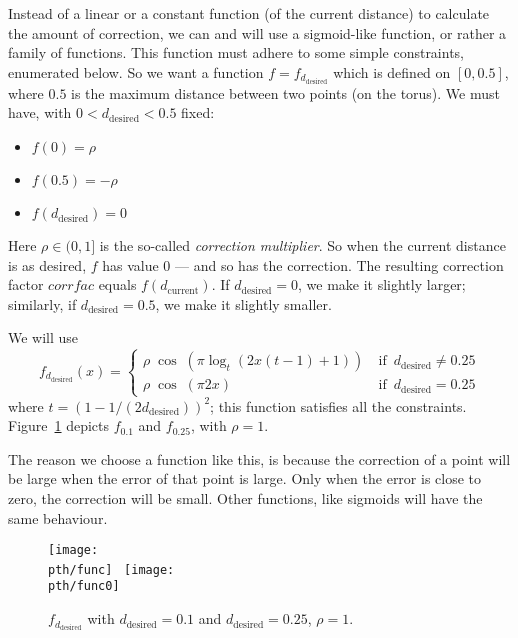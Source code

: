 \documentclass{article}
\theoremstyle{definition}
\begin{document}
Instead of a linear or a constant function (of the current distance) to
calculate the amount of correction, we can and will use a sigmoid-like
function, or rather a family of functions. This function must adhere to some
simple constraints, enumerated below. So we want a function
$f=f_{d_\mathrm{desired}}$ which is defined on $[0,0.5]$, where $0.5$ is the
maximum distance between two points (on the torus). We must have, with
$0<d_\mathrm{desired}<0.5$ fixed:
\begin{itemize}
\item $f(0) = \rho$
\item $f(0.5) = -\rho$
\item $f(d_\mathrm{desired}) = 0$
\end{itemize}
Here $\rho\in(0,1]$ is the so-called \emph{correction multiplier}. So when the
current distance is as desired, $f$ has value 0 --- and so has the correction.
The resulting correction factor $\mathit{corrfac}$ equals
$f(d_\mathrm{current})$. If $d_\mathrm{desired}=0$, we make it slightly
larger; similarly, if $d_\mathrm{desired}=0.5$, we make it slightly smaller.

We will use
\begin{displaymath}
  f_{d_{\mathrm{desired}}}(x)=
  \left\{\begin{array}{ll}
  \rho\;\cos\;(\pi \log_t (2x (t - 1) + 1)) &\mathrm{\ if\ \;} d_\mathrm{desired} \neq 0.25 \\
  \rho\;\cos\;(\pi 2x) &\mathrm{\ if\ \;} d_\mathrm{desired} = 0.25
  \end{array}\right.
\end{displaymath}
where $t = (1-1/{(2d_\mathrm{desired})})^2$; this function satisfies all the
constraints. Figure~\ref{to:sinus} depicts $f_{0.1}$ and $f_{0.25}$, with $\rho=1$.

The reason we choose a function like this, is because the correction of a 
point will be large when the error of that point is large. Only when the 
error is close to zero, the correction will be small. Other functions, like
sigmoids will have the same behaviour. 

\begin{figure}[!ht]
\begin{center}
\texttt{[image: \\pth/func]}
\ \texttt{[image: \\pth/func0]}
\caption{$f_{d_{\mathrm{desired}}}$ with $d_\mathrm{desired}=0.1$ and $d_\mathrm{desired}=0.25$, $\rho=1$.}\label{to:sinus}
\end{center}
\end{figure}
\end{document}

